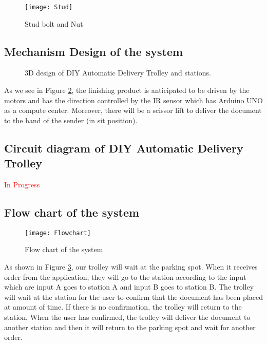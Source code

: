 \documentclass[12pt]{article}
\begin{document}
\begin{figure}[H]
	\centering
	\texttt{[image: Stud]}
	\caption{Stud bolt and Nut} \label{fig:stud}
\end{figure}


\subsection{Mechanism Design of the system} \label{sub:mechanism}

\begin{figure}[H]
	\centering
	 \hspace{1cm}
	\caption{3D design of DIY Automatic Delivery Trolley and stations.} \label{fig:3ddesign}
\end{figure}

As we see in Figure \ref{fig:3ddesign}, the finishing product is anticipated to be driven by the motors and has the direction controlled by the IR sensor which has Arduino UNO as a compute center. Moreover, there will be a scissor lift to deliver the document to the hand of the sender (in sit position).

\subsection{Circuit diagram of DIY Automatic Delivery Trolley} \label{sub:circuit}

\begin{center}
	\textcolor{red}{In Progress}
\end{center}

\subsection{Flow chart of the system}

\begin{figure}[H]
	\centering
	\texttt{[image: Flowchart]}
	\caption{Flow chart of the system} \label{fig:flowchart}
\end{figure}

As shown in Figure \ref{fig:flowchart}, our trolley will wait at the parking spot. When it receives order from the application, they will go to the station according to the input which are input A goes to station A and input B goes to station B. The trolley will wait at the station for the user to confirm that the document has been placed at amount of time. If there is no confirmation, the trolley will return to the station. When the user has confirmed, the trolley will deliver the document to another station and then it will return to the parking spot and wait for another order.
\end{document}
